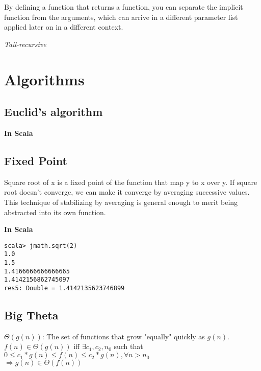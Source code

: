 \documentclass[12pt]{article}
\begin{document}
By defining a function that returns a function, you can separate the implicit function from the arguments, which can arrive in a different parameter list applied later on in a different context.

\textit{Tail-recursive}






\section{Algorithms}

\subsection{Euclid's algorithm}

\textbf{In Scala}





\subsection{Fixed Point}

Square root of x is a fixed point of the function that map y to x over y. If square root doesn't converge, we can make it converge by averaging successive values. This technique of stabilizing by averaging is general enough to merit being abstracted into its own function. 

\textbf{In Scala}



\begin{verbatim}
scala> jmath.sqrt(2)
1.0
1.5
1.4166666666666665
1.4142156862745097
res5: Double = 1.4142135623746899
\end{verbatim}


\subsection{Big Theta}

$\Theta(g(n))$: The set of functions that grow "equally" quickly as $g(n)$.\\
$f(n)\in\Theta(g(n))$ iff $\exists c_1, c_2, n_0$ such that $0\le c_1*g(n) \le f(n) \le c_2*g(n), \forall n>n_0$\\
$\Rightarrow g(n)\in\Theta(f(n))$
\end{document}

